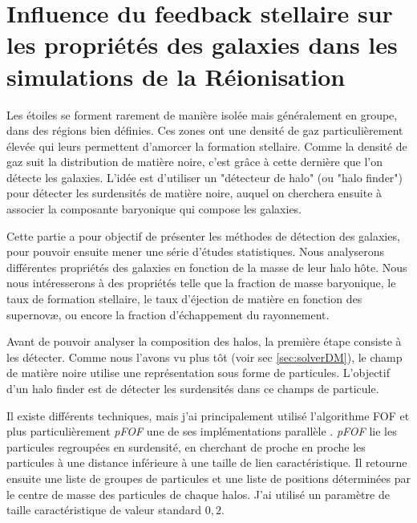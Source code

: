 \chapter{Influence du feedback stellaire sur les propriétés des galaxies dans les simulations de la Réionisation}
\label{sec:galaxies}



Les étoiles se forment rarement de manière isolée mais généralement en groupe, dans des régions bien définies. %
Ces zones ont une densité de gaz particulièrement élevée qui leurs permettent d'amorcer la formation stellaire. %
Comme la densité de gaz suit la distribution de matière noire, c'est grâce à cette dernière que l'on détecte les galaxies.
L'idée est d'utiliser un "détecteur de halo" (ou "halo finder") pour détecter les surdensités de matière noire, auquel on cherchera ensuite à associer la composante baryonique qui compose les galaxies.

Cette partie a pour objectif de présenter les méthodes de détection des galaxies, pour pouvoir ensuite mener une série d'études statistiques.
Nous analyserons différentes propriétés des galaxies en fonction de la masse de leur halo hôte.
Nous nous intéresserons à des propriétés telle que la fraction de masse baryonique, le taux de formation stellaire, le taux d'éjection de matière en fonction des supernovæ, ou encore la fraction d'échappement du rayonnement.



Avant de pouvoir analyser la composition des halos, la première étape consiste à les détecter.
Comme nous l'avons vu plus tôt (voir sec \ref{sec:solverDM}), le champ de matière noire utilise une représentation sous forme de particules.
L'objectif d'un halo finder est de détecter les surdensités dans ce champs de particule.

Il existe différents techniques, mais j'ai principalement utilisé l’algorithme \ac{FOF} et plus particulièrement \textit{pFOF} une de ses implémentations parallèle \citep{2014A&A...564A..13R}.
\textit{pFOF} lie les particules regroupées en surdensité, en cherchant de proche en proche les particules à une distance inférieure à une taille de lien caractéristique.
Il retourne ensuite une liste de groupes de particules et une liste de positions déterminées par le centre de masse des particules de chaque halos.
J'ai utilisé un paramètre de taille caractéristique de valeur standard $0,2$.

